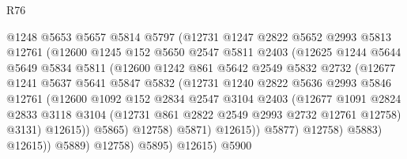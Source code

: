 \begin{lexlean}{R76}
\begin{coremodule}
                      @1248
                      @5653
                      @5657
                      @5814
                      @5797
                      (@12731
                        @1247
                        @2822
                        @5652
                        @2993
                        @5813
                        @12761
                        (@12600
                          @1245
                          @152
                          @5650
                          @2547
                          @5811
                          @2403
                          (@12625
                            @1244
                            @5644
                            @5649
                            @5834
                            @5811
                            (@12600
                              @1242
                              @861
                              @5642
                              @2549
                              @5832
                              @2732
                              (@12677
                                @1241
                                @5637
                                @5641
                                @5847
                                @5832
                                (@12731
                                  @1240
                                  @2822
                                  @5636
                                  @2993
                                  @5846
                                  @12761
                                  (@12600
                                    @1092
                                    @152
                                    @2834
                                    @2547
                                    @3104
                                    @2403
                                    (@12677
                                      @1091
                                      @2824
                                      @2833
                                      @3118
                                      @3104
                                      (@12731 @861 @2822 @2549 @2993 @2732 @12761 @12758)
                                      @3131)
                                    @12615))
                                @5865)
                              @12758)
                            @5871)
                          @12615))
                      @5877)
                    @12758)
                  @5883)
                @12615))
            @5889)
          @12758)
        @5895)
      @12615)
    @5900

\end{coremodule}
\end{lexlean}
